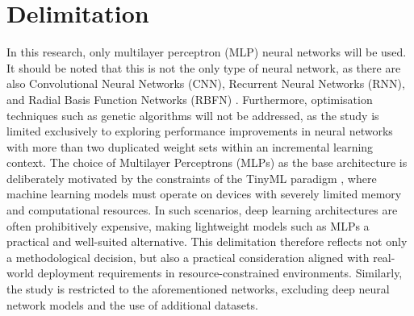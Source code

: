 \section{Delimitation}
\label{sec:delimitation}

In this research, only multilayer perceptron (MLP) neural networks will be used. It should be noted that this is not the only type of neural network, as there are also Convolutional Neural Networks (CNN), Recurrent Neural Networks (RNN), and Radial Basis Function Networks (RBFN) \cite{royo2021}.  
Furthermore, optimisation techniques such as genetic algorithms will not be addressed, as 
the study is limited exclusively to exploring performance improvements in neural networks 
with more than two duplicated weight sets within an incremental learning context. The 
choice of Multilayer Perceptrons (MLPs) as the base architecture is deliberately motivated 
by the constraints of the TinyML paradigm \cite{warden2019tinyml}, where machine learning 
models must operate on devices with severely limited memory and computational resources. 
In such scenarios, deep learning architectures are often prohibitively expensive, making 
lightweight models such as MLPs a practical and well-suited alternative. This delimitation 
therefore reflects not only a methodological decision, but also a practical consideration 
aligned with real-world deployment requirements in resource-constrained environments. 
Similarly, the study is restricted to the aforementioned networks, excluding deep neural network models and the use of additional datasets.
